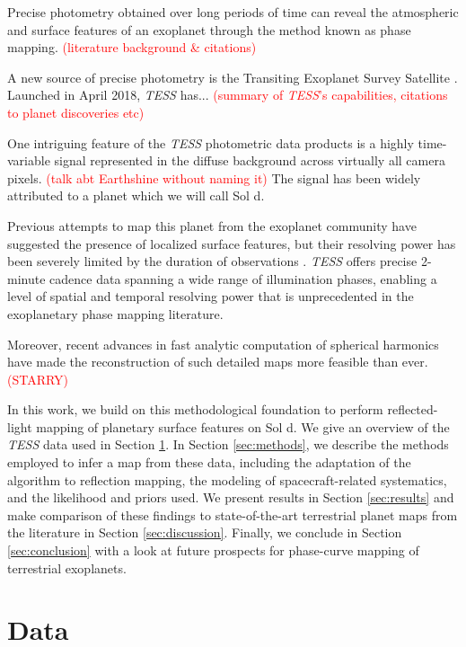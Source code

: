 \documentclass[modern]{aastex62}
\newcommand{\TESS}{\emph{TESS}\xspace}
\newcommand{\todo}[1]{\textcolor{red}{#1}}
\begin{document}
Precise photometry obtained over long periods of time can reveal the atmospheric 
and surface features of an exoplanet through the method known as phase mapping. 
\todo{(literature background \& citations)}

A new source of precise photometry is the Transiting Exoplanet Survey Satellite 
\citep[\TESS; ][]{Ricker2015}. 
Launched in April 2018, \TESS has... \todo{(summary of \TESS's capabilities, 
citations to planet discoveries etc)}

One intriguing feature of the \TESS photometric data products is a highly 
time-variable signal represented in the diffuse background across virtually 
all camera pixels. 
\todo{(talk abt Earthshine without naming it)} 
The signal has been widely attributed to a planet which we will call Sol d.

Previous attempts to map this planet from the exoplanet community have suggested 
the presence of localized surface features, but their resolving power has been 
severely limited by the duration of observations \citep{Cowan2009}. 
\TESS offers precise 2-minute cadence data spanning a wide range of illumination 
phases, enabling a level of spatial and temporal resolving power that is 
unprecedented in the exoplanetary phase mapping literature. 

Moreover, recent advances in fast analytic computation of spherical harmonics 
have made the reconstruction of such detailed maps more feasible than ever. 
\todo{(STARRY)}

In this work, we build on this methodological foundation to perform 
reflected-light mapping of planetary surface features on Sol d. 
We give an overview of the \TESS data used in Section \ref{sec:data}. 
In Section \ref{sec:methods}, we describe the methods employed to infer a map 
from these data, including the adaptation of the \starry algorithm to reflection 
mapping, the modeling of spacecraft-related systematics, and the likelihood and 
priors used. 
We present results in Section \ref{sec:results} and make comparison of these 
findings to state-of-the-art terrestrial planet maps from the literature in 
Section \ref{sec:discussion}. 
Finally, we conclude in Section \ref{sec:conclusion} with a look at future 
prospects for phase-curve mapping of terrestrial exoplanets.

\section{Data}
\label{sec:data}
\end{document}
